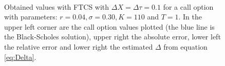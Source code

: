 \documentclass[11pt,a4paper]{article}
\begin{document}
\begin{figure}[H]
  \centering
   \\
  \caption{Obtained values with FTCS with $\Delta X=\Delta \tau=0.1$ for a call option with parameters: $r = 0.04, \sigma = 0.30, K = 110$ and $T = 1$. In the upper left corner are the call option values plotted (the blue line is the Black-Scholes solution), upper right the absolute error, lower left the relative error and lower right the estimated $\Delta$ from equation \ref{eq:Delta}.}
	\label{fig:FTCS}
\end{figure}
\end{document}
